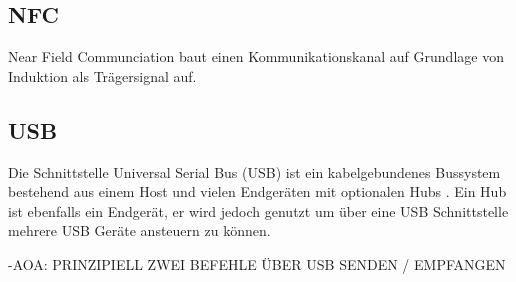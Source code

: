 	\subsection{NFC}
	
	Near Field Communciation baut einen Kommunikationskanal auf Grundlage von Induktion als Trägersignal auf.
	
	\subsection{USB}
	Die Schnittstelle Universal Serial Bus (USB) ist ein kabelgebundenes Bussystem bestehend aus einem Host und vielen Endgeräten mit optionalen Hubs \cite[S.23f]{Kelm}. Ein Hub ist ebenfalls ein Endgerät, er wird jedoch genutzt um über eine USB Schnittstelle mehrere USB Geräte ansteuern zu können.

-AOA: PRINZIPIELL ZWEI BEFEHLE ÜBER USB SENDEN / EMPFANGEN